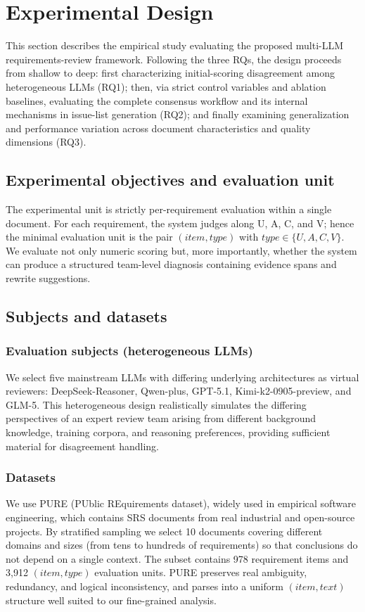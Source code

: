 \documentclass[sn-mathphys-num]{sn-jnl}
\begin{document}
\section{Experimental Design}\label{sec:experiment}
This section describes the empirical study evaluating the proposed multi-LLM requirements-review framework. Following the three RQs, the design proceeds from shallow to deep: first characterizing initial-scoring disagreement among heterogeneous LLMs (RQ1); then, via strict control variables and ablation baselines, evaluating the complete consensus workflow and its internal mechanisms in issue-list generation (RQ2); and finally examining generalization and performance variation across document characteristics and quality dimensions (RQ3).

\subsection{Experimental objectives and evaluation unit}
The experimental unit is strictly per-requirement evaluation within a single document. For each requirement, the system judges along U, A, C, and V; hence the minimal evaluation unit is the pair $(item,type)$ with $type\in\{U,A,C,V\}$. We evaluate not only numeric scoring but, more importantly, whether the system can produce a structured team-level diagnosis containing evidence spans and rewrite suggestions.

\subsection{Subjects and datasets}
\subsubsection{Evaluation subjects (heterogeneous LLMs)}
We select five mainstream LLMs with differing underlying architectures as virtual reviewers: DeepSeek-Reasoner, Qwen-plus, GPT-5.1, Kimi-k2-0905-preview, and GLM-5. This heterogeneous design realistically simulates the differing perspectives of an expert review team arising from different background knowledge, training corpora, and reasoning preferences, providing sufficient material for disagreement handling.

\subsubsection{Datasets}\label{sec:datasets}
We use PURE (PUblic REquirements dataset), widely used in empirical software engineering, which contains SRS documents from real industrial and open-source projects. By stratified sampling we select 10 documents covering different domains and sizes (from tens to hundreds of requirements) so that conclusions do not depend on a single context. The subset contains 978 requirement items and 3{,}912 $(item,type)$ evaluation units. PURE preserves real ambiguity, redundancy, and logical inconsistency, and parses into a uniform $(item, text)$ structure well suited to our fine-grained analysis.
\end{document}
